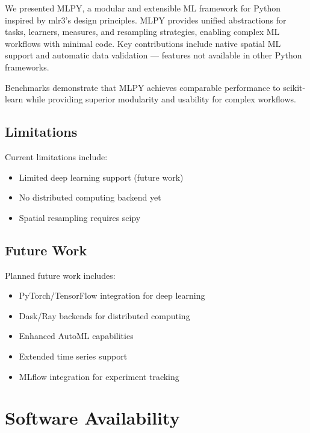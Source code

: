\documentclass[twoside,11pt]{article}
\begin{document}
We presented MLPY, a modular and extensible ML framework for Python inspired by
mlr3's design principles. MLPY provides unified abstractions for tasks, learners,
measures, and resampling strategies, enabling complex ML workflows with minimal
code. Key contributions include native spatial ML support and automatic data
validation --- features not available in other Python frameworks.

Benchmarks demonstrate that MLPY achieves comparable performance to scikit-learn
while providing superior modularity and usability for complex workflows.

\subsection{Limitations}

Current limitations include:
\begin{itemize}
  \item Limited deep learning support (future work)
  \item No distributed computing backend yet
  \item Spatial resampling requires scipy
\end{itemize}

\subsection{Future Work}

Planned future work includes:
\begin{itemize}
  \item PyTorch/TensorFlow integration for deep learning
  \item Dask/Ray backends for distributed computing
  \item Enhanced AutoML capabilities
  \item Extended time series support
  \item MLflow integration for experiment tracking
\end{itemize}

\section{Software Availability}
\label{sec:software}
\end{document}
